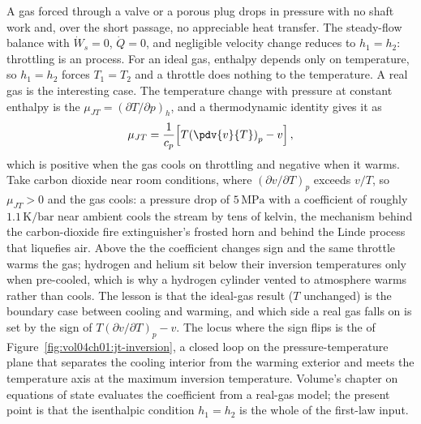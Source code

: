 A gas forced through a valve or a porous plug drops in pressure with no
shaft work and, over the short passage, no appreciable heat transfer.
The steady-flow balance with $\dot{W}_s = 0$, $\dot{Q} = 0$, and
negligible velocity change reduces to $h_1 = h_2$: throttling is an
 process. For an ideal gas, enthalpy depends only on
temperature, so $h_1 = h_2$ forces $T_1 = T_2$ and a throttle does
nothing to the temperature. A real gas is the interesting case. The
temperature change with pressure at constant enthalpy is the
 $\mu_{JT} = (\partial T/\partial
p)_h$, and a thermodynamic identity gives it as
\[
\mu_{JT} = \frac{1}{c_p}\!\left[T\!\left(\pdv{v}{T}\right)_p - v\right],
\]
which is positive when the gas cools on throttling and negative when it
warms. Take carbon dioxide near room conditions, where $(\partial v/
\partial T)_p$ exceeds $v/T$, so $\mu_{JT} > 0$ and the gas cools: a
pressure drop of $5\,\text{MPa}$ with a coefficient of roughly
$1.1\,\si{\kelvin}/\text{bar}$ near ambient cools the stream by tens of
kelvin, the mechanism behind the carbon-dioxide fire extinguisher's
frosted horn and behind the Linde process that liquefies air. Above the
 the coefficient changes sign and the same
throttle warms the gas; hydrogen and helium sit below their inversion
temperatures only when pre-cooled, which is why a hydrogen cylinder
vented to atmosphere warms rather than cools. The lesson is that the
ideal-gas result ($T$ unchanged) is the boundary case between cooling and
warming, and which side a real gas falls on is set by the sign of
$T(\partial v/\partial T)_p - v$. The locus where the sign flips is the
 of Figure~\ref{fig:vol04ch01:jt-inversion}, a closed
loop on the pressure-temperature plane that separates the cooling interior from
the warming exterior and meets the temperature axis at the maximum inversion
temperature. Volume's chapter on equations of state evaluates the coefficient
from a real-gas model; the present point is that the isenthalpic condition
$h_1 = h_2$ is the whole of the first-law input.



